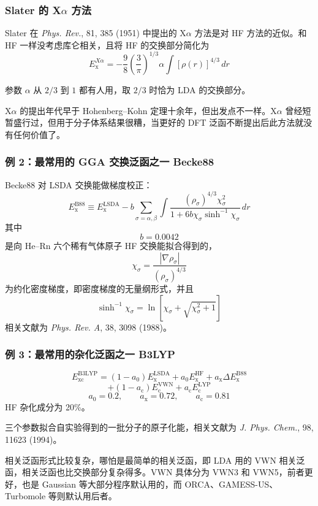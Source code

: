 \subsubsection*{Slater 的 X$\alpha$ 方法}

Slater 在 \textit{Phys. Rev.}, 81, 385 (1951) 中提出的 X$\alpha$ 方法是对 HF 方法的近似。和 HF 一样没考虑库仑相关，且将 HF 的交换部分简化为
\[
E_{\mathrm{x}}^{X\alpha}
=
-\frac{9}{8}\left(\frac{3}{\pi}\right)^{1/3}
\alpha\int [\rho(r)]^{4/3}\,dr
\]

参数 $\alpha$ 从 $2/3$ 到 $1$ 都有人用，取 $2/3$ 时恰为 LDA 的交换部分。

X$\alpha$ 的提出年代早于 Hohenberg--Kohn 定理十余年，但出发点不一样。X$\alpha$ 曾经短暂盛行过，但用于分子体系结果很糟，当更好的 DFT 泛函不断提出后此方法就没有任何价值了。

\subsubsection*{例 2：最常用的 GGA 交换泛函之一 Becke88}

Becke88 对 LSDA 交换能做梯度校正：
\[
E_{\mathrm{x}}^{\mathrm{B88}}
\equiv
E_{\mathrm{x}}^{\mathrm{LSDA}}
-b\sum_{\sigma=\alpha,\beta}
\int
\frac{(\rho_\sigma)^{4/3}\chi_\sigma^2}
{1+6b\chi_\sigma \sinh^{-1}\chi_\sigma}
\,dr
\]
其中
\[
b=0.0042
\]
是向 He--Rn 六个稀有气体原子 HF 交换能拟合得到的，
\[
\chi_\sigma=\frac{|\nabla\rho_\sigma|}{(\rho_\sigma)^{4/3}}
\]
为约化密度梯度，即密度梯度的无量纲形式，并且
\[
\sinh^{-1}\chi_\sigma
=
\ln\left[\chi_\sigma+\sqrt{\chi_\sigma^2+1}\right]
\]
相关文献为 \textit{Phys. Rev. A}, 38, 3098 (1988)。

\subsubsection*{例 3：最常用的杂化泛函之一 B3LYP}

\begingroup
\small
\[
E_{\mathrm{xc}}^{\mathrm{B3LYP}}
=
(1-a_0)E_{\mathrm{x}}^{\mathrm{LSDA}}
+a_0E_{\mathrm{x}}^{\mathrm{HF}}
+a_{\mathrm{x}}\Delta E_{\mathrm{x}}^{\mathrm{B88}}
\]
\[
+(1-a_{\mathrm{c}})E_{\mathrm{c}}^{\mathrm{VWN}}
+a_{\mathrm{c}}E_{\mathrm{c}}^{\mathrm{LYP}}
\]
\endgroup
\[
a_0=0.2,\qquad a_{\mathrm{x}}=0.72,\qquad a_{\mathrm{c}}=0.81
\]
HF 杂化成分为 20\%。

三个参数拟合自实验得到的一批分子的原子化能，相关文献为 \textit{J. Phys. Chem.}, 98, 11623 (1994)。

相关泛函形式比较复杂，哪怕是最简单的相关泛函，即 LDA 用的 VWN 相关泛函，相关泛函也比交换部分复杂得多。VWN 具体分为 VWN3 和 VWN5，前者更好，也是 Gaussian 等大部分程序默认用的，而 ORCA、GAMESS-US、Turbomole 等则默认用后者。

